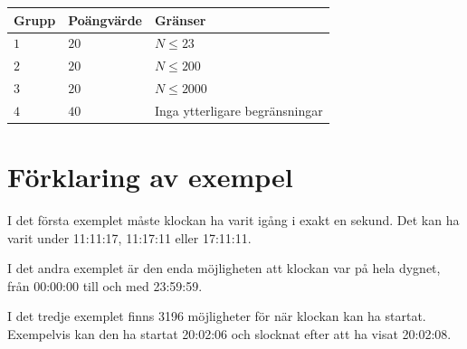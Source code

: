 \noindent
\begin{tabular}{| l | l | l |}
  \hline
  Grupp & Poängvärde & Gränser \\ \hline
  $1$    & $20$        &  $ N \leq 23 $ \\ \hline 
  $2$    & $20$        &  $ N \leq 200 $ \\ \hline
  $3$    & $20$        &  $ N \leq 2000 $ \\ \hline
  $4$    & $40$        &  Inga ytterligare begränsningar \\ \hline
\end{tabular}


\section*{Förklaring av exempel}
I det första exemplet måste klockan ha varit igång i exakt en sekund. Det kan ha varit under 11:11:17, 11:17:11 eller 17:11:11.

I det andra exemplet är den enda möjligheten att klockan var på hela dygnet, från 00:00:00 till och med 23:59:59.

I det tredje exemplet finns 3196 möjligheter för när klockan kan ha startat. Exempelvis kan den ha startat 20:02:06 och slocknat efter att ha visat 20:02:08.
